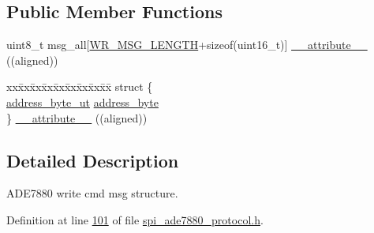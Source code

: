 \subsection*{Public Member Functions}
\begin{DoxyCompactItemize}
\item 
uint8\-\_\-t msg\-\_\-all\mbox{[}\hyperlink{a00041_ac85ecf34a5cbd85d6dbd51b4c9a5469e}{W\-R\-\_\-\-M\-S\-G\-\_\-\-L\-E\-N\-G\-T\-H}+sizeof(uint16\-\_\-t)\mbox{]} \hyperlink{a00017_afa80156911a670265324649d35d2cb6c}{\-\_\-\-\_\-attribute\-\_\-\-\_\-} ((aligned))
\item 
\begin{tabbing}
xx\=xx\=xx\=xx\=xx\=xx\=xx\=xx\=xx\=\kill
struct \{\\
\>\hyperlink{a00011}{address\_byte\_ut} \hyperlink{a00017_af6a65bac733ea3e9b1d24b065163d49a}{address\_byte}\\
\} \hyperlink{a00017_a8795d880c23c8d79ef819f4eb18b0998}{\_\_attribute\_\_} ((aligned))\\

\end{tabbing}\end{DoxyCompactItemize}


\subsection{Detailed Description}
A\-D\-E7880 write cmd msg structure. 

Definition at line \hyperlink{a00041_source_l00101}{101} of file \hyperlink{a00041_source}{spi\-\_\-ade7880\-\_\-protocol.\-h}.




